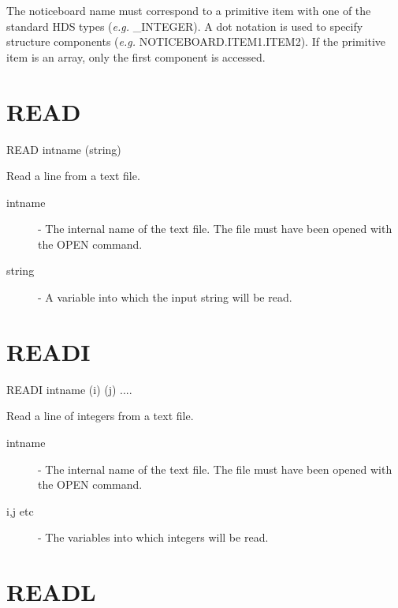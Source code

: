 \documentclass[twoside,11pt,nolof,chapters]{starlink}
\begin{document}
The noticeboard name must correspond to a primitive item with one of the
standard HDS types (\emph{e.g.} \_INTEGER).
A dot notation is used to specify structure
components (\emph{e.g.} NOTICEBOARD.ITEM1.ITEM2).
If the primitive item is an array, only the first component is accessed.


\section{READ\label{READ}}

   READ \hspace{.5cm} intname \hspace{.5cm}  (string)

 Read a line from a text file.
\begin{description}

\item[intname]  -  The internal name of the text file. The file must have
                   been opened with the OPEN command.

\item[string]  -  A variable into which the input string will be read.

\end{description}


\section{READI\label{READI}}


    READI \hspace{.5cm} intname \hspace{.5cm} (i) \hspace{.5cm} (j)  ....

 Read a line of integers from a text file.

\begin{description}

\item[intname]  -  The internal name of the text file. The file must have
                   been opened with the OPEN command.

\item[i,j etc] -  The variables into which integers will be read.

\end{description}

\section{READL\label{READL}}
\end{document}
